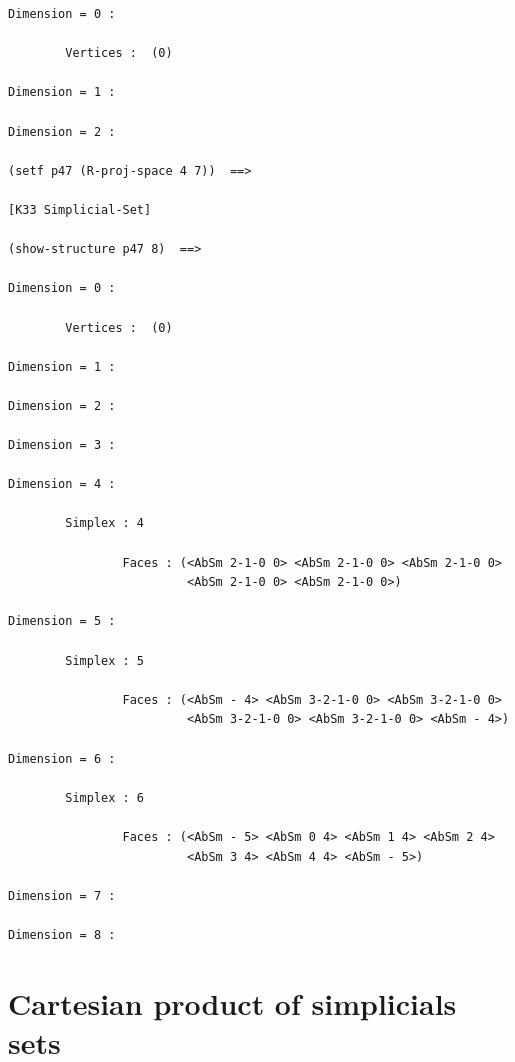 {{\begin{verbatim}
Dimension = 0 :

        Vertices :  (0)

Dimension = 1 :

Dimension = 2 :

(setf p47 (R-proj-space 4 7))  ==>

[K33 Simplicial-Set]

(show-structure p47 8)  ==>

Dimension = 0 :

        Vertices :  (0)

Dimension = 1 :

Dimension = 2 :

Dimension = 3 :

Dimension = 4 :

        Simplex : 4

                Faces : (<AbSm 2-1-0 0> <AbSm 2-1-0 0> <AbSm 2-1-0 0> 
                         <AbSm 2-1-0 0> <AbSm 2-1-0 0>)

Dimension = 5 :

        Simplex : 5

                Faces : (<AbSm - 4> <AbSm 3-2-1-0 0> <AbSm 3-2-1-0 0> 
                         <AbSm 3-2-1-0 0> <AbSm 3-2-1-0 0> <AbSm - 4>)

Dimension = 6 :

        Simplex : 6

                Faces : (<AbSm - 5> <AbSm 0 4> <AbSm 1 4> <AbSm 2 4> 
                         <AbSm 3 4> <AbSm 4 4> <AbSm - 5>)

Dimension = 7 :

Dimension = 8 :
\end{verbatim}}

\newpage

\section {Cartesian product of  simplicials sets }

}
